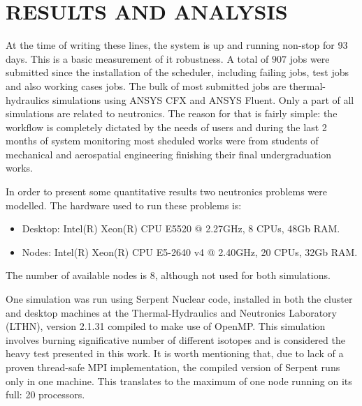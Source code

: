 \documentclass[twoside,a4paper,12pt,english]{inac19}
\begin{document}


\section{RESULTS AND ANALYSIS}

At the time of writing these lines, the system is up and running non-stop for 93 days. This is a
basic measurement of it robustness. A total of $907$ jobs were submitted since the installation
of the scheduler, including failing jobs,
test jobs and also working cases jobs. The bulk of most submitted jobs are thermal-hydraulics
simulations using ANSYS CFX and ANSYS Fluent. Only a part of all simulations are related to neutronics.
The reason for that is fairly simple: the workflow is completely dictated by the needs of users
and during the last 2 months of system monitoring most sheduled works were from students of mechanical
and aerospatial engineering finishing their final undergraduation works.

In order to present some quantitative results two neutronics problems were modelled. The hardware used
to run these problems is:

\begin{itemize}
\item Desktop: Intel(R) Xeon(R) CPU E5520 @ 2.27GHz, 8 CPUs, 48Gb RAM.
\item Nodes: Intel(R) Xeon(R) CPU E5-2640 v4 @ 2.40GHz, 20 CPUs, 32Gb RAM.
\end{itemize}

The number of available nodes is 8, although not used for both simulations.

One simulation was run using Serpent Nuclear code, installed in both the cluster and desktop machines at the Thermal-Hydraulics
and Neutronics Laboratory (LTHN), version 2.1.31 compiled to make use of OpenMP\cite{openMP}. This simulation involves burning
significative number of different isotopes and is considered the heavy test presented in this work. It is worth mentioning
that, due to lack of a proven thread-safe MPI implementation, the compiled version of Serpent runs only in one machine.
This translates to the maximum of one node running on its full: 20 processors.
\end{document}
